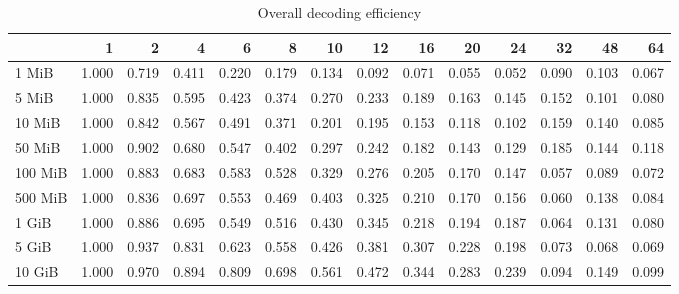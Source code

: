 \begin{centering}
\begin{table}[!h]
	\caption{Overall decoding efficiency}
	\begin{tabular}{lrrrrrrrrrrrrr}
		\toprule
		\diagbox[width=7em]{Size}{Threads}  &    1  &    2  &    4  &    6  &    8  &    10 &    12 &    16 &    20 &    24 &    32 &    48 &    64 \\
		\midrule
		1 MiB   & 1.000 & 0.719 & 0.411 & 0.220 & 0.179 & 0.134 & 0.092 & 0.071 & 0.055 & 0.052 & 0.090 & 0.103 & 0.067 \\
		5 MiB   & 1.000 & 0.835 & 0.595 & 0.423 & 0.374 & 0.270 & 0.233 & 0.189 & 0.163 & 0.145 & 0.152 & 0.101 & 0.080 \\
		10 MiB  & 1.000 & 0.842 & 0.567 & 0.491 & 0.371 & 0.201 & 0.195 & 0.153 & 0.118 & 0.102 & 0.159 & 0.140 & 0.085 \\
		50 MiB  & 1.000 & 0.902 & 0.680 & 0.547 & 0.402 & 0.297 & 0.242 & 0.182 & 0.143 & 0.129 & 0.185 & 0.144 & 0.118 \\
		100 MiB & 1.000 & 0.883 & 0.683 & 0.583 & 0.528 & 0.329 & 0.276 & 0.205 & 0.170 & 0.147 & 0.057 & 0.089 & 0.072 \\
		500 MiB & 1.000 & 0.836 & 0.697 & 0.553 & 0.469 & 0.403 & 0.325 & 0.210 & 0.170 & 0.156 & 0.060 & 0.138 & 0.084 \\
		1 GiB   & 1.000 & 0.886 & 0.695 & 0.549 & 0.516 & 0.430 & 0.345 & 0.218 & 0.194 & 0.187 & 0.064 & 0.131 & 0.080 \\
		5 GiB   & 1.000 & 0.937 & 0.831 & 0.623 & 0.558 & 0.426 & 0.381 & 0.307 & 0.228 & 0.198 & 0.073 & 0.068 & 0.069 \\
		10 GiB  & 1.000 & 0.970 & 0.894 & 0.809 & 0.698 & 0.561 & 0.472 & 0.344 & 0.283 & 0.239 & 0.094 & 0.149 & 0.099 \\
		\bottomrule
	\end{tabular}
\end{table}


\end{centering}
